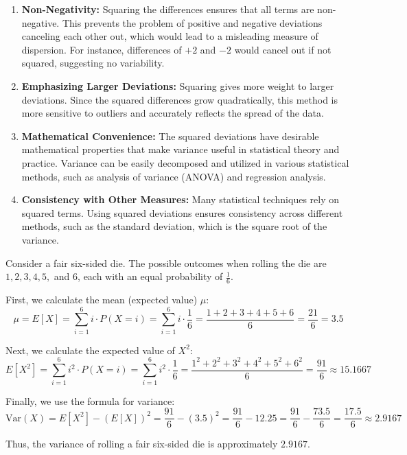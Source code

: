 \begin{enumerate}
    \item \textbf{Non-Negativity:} Squaring the differences ensures that all terms are non-negative. This prevents the problem of positive and negative deviations canceling each other out, which would lead to a misleading measure of dispersion. For instance, differences of \(+2\) and \(-2\) would cancel out if not squared, suggesting no variability.
    \item \textbf{Emphasizing Larger Deviations:} Squaring gives more weight to larger deviations. Since the squared differences grow quadratically, this method is more sensitive to outliers and accurately reflects the spread of the data.
    \item \textbf{Mathematical Convenience:} The squared deviations have desirable mathematical properties that make variance useful in statistical theory and practice. Variance can be easily decomposed and utilized in various statistical methods, such as analysis of variance (ANOVA) and regression analysis.
    \item \textbf{Consistency with Other Measures:} Many statistical techniques rely on squared terms. Using squared deviations ensures consistency across different methods, such as the standard deviation, which is the square root of the variance.
\end{enumerate}

\begin{example}
Consider a fair six-sided die. The possible outcomes when rolling the die are \(1, 2, 3, 4, 5, \) and \(6\), each with an equal probability of \( \frac{1}{6} \).

First, we calculate the mean (expected value) \( \mu \):
\[
\mu = {E}[X] = \sum_{i=1}^{6} i \cdot P(X = i) = \sum_{i=1}^{6} i \cdot \frac{1}{6} = \frac{1 + 2 + 3 + 4 + 5 + 6}{6} = \frac{21}{6} = 3.5
\]

Next, we calculate the expected value of \( X^2 \):
\[
{E}[X^2] = \sum_{i=1}^{6} i^2 \cdot P(X = i) = \sum_{i=1}^{6} i^2 \cdot \frac{1}{6} = \frac{1^2 + 2^2 + 3^2 + 4^2 + 5^2 + 6^2}{6} =  \frac{91}{6} \approx 15.1667
\]

Finally, we use the formula for variance:
\[
\text{Var}(X) = {E}[X^2] - ({E}[X])^2 = \frac{91}{6} - (3.5)^2 = \frac{91}{6} - 12.25 = \frac{91}{6} - \frac{73.5}{6} = \frac{17.5}{6} \approx 2.9167
\]

Thus, the variance of rolling a fair six-sided die is approximately \(2.9167\).
\end{example}

